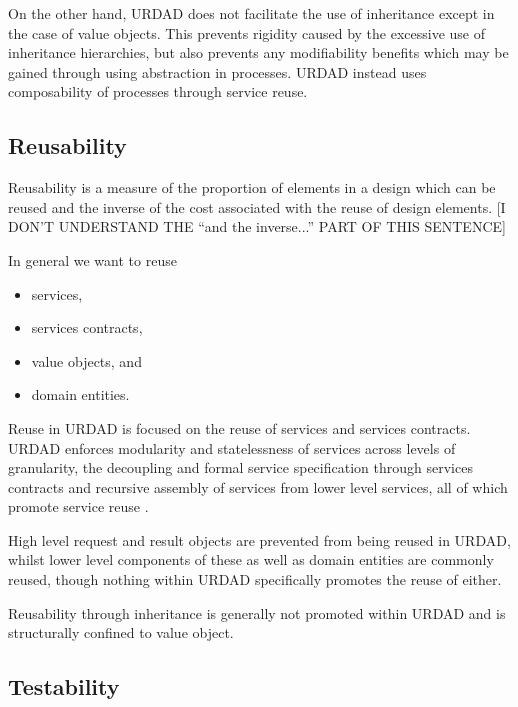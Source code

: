 On the other hand, URDAD does not facilitate the use of inheritance except in the case of value objects. This prevents rigidity caused by the excessive use of inheritance hierarchies, but also prevents any modifiability benefits which may be gained through using abstraction in processes. URDAD instead uses composability of processes through service reuse.



\subsection{Reusability}
Reusability is a measure of the proportion of elements in a design which can be reused and the inverse of the cost associated with the reuse of design elements. [I DON'T UNDERSTAND THE ``and the inverse...'' PART OF THIS SENTENCE]

In general we want to reuse
\begin{itemize}
\item services,
\item services contracts,
\item value objects, and
\item domain entities.
\end{itemize}

Reuse in URDAD is focused on the reuse of services and services contracts.
URDAD enforces modularity and statelessness of services across levels of granularity, the decoupling and formal service specification through services contracts and recursive assembly of services from lower level services, all of which promote service reuse \cite{feuerlicht_2007:determinantsOfServiceReusability, choi_2008:qualityModelForEvaluatingReusabilityOfServices}.

High level request and result objects are prevented from being reused in URDAD, whilst lower level components of these as well as domain entities are commonly reused, though nothing within URDAD specifically promotes the reuse of either. 

Reusability through inheritance \cite{marinescu_1999:measurementOfReuseByInheritance} is generally not promoted within URDAD and is structurally confined to value object.



\subsection{Testability}

